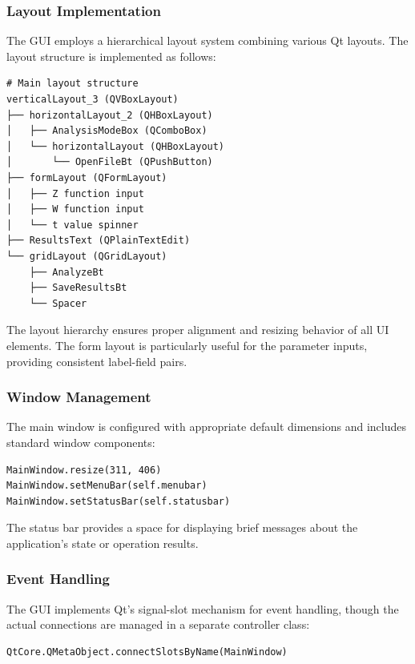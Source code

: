 \documentclass{article}
\begin{document}
\subsubsection{Layout Implementation}

The GUI employs a hierarchical layout system combining various Qt layouts. The layout structure is implemented as follows:

\begin{verbatim}
# Main layout structure
verticalLayout_3 (QVBoxLayout)
├── horizontalLayout_2 (QHBoxLayout)
│   ├── AnalysisModeBox (QComboBox)
│   └── horizontalLayout (QHBoxLayout)
│       └── OpenFileBt (QPushButton)
├── formLayout (QFormLayout)
│   ├── Z function input
│   ├── W function input
│   └── t value spinner
├── ResultsText (QPlainTextEdit)
└── gridLayout (QGridLayout)
    ├── AnalyzeBt
    ├── SaveResultsBt
    └── Spacer
\end{verbatim}

The layout hierarchy ensures proper alignment and resizing behavior of all UI elements. The form layout is particularly useful for the parameter inputs, providing consistent label-field pairs.

\subsubsection{Window Management}

The main window is configured with appropriate default dimensions and includes standard window components:

\begin{verbatim}
MainWindow.resize(311, 406)
MainWindow.setMenuBar(self.menubar)
MainWindow.setStatusBar(self.statusbar)
\end{verbatim}

The status bar provides a space for displaying brief messages about the application's state or operation results.

\subsubsection{Event Handling}

The GUI implements Qt's signal-slot mechanism for event handling, though the actual connections are managed in a separate controller class:

\begin{verbatim}
QtCore.QMetaObject.connectSlotsByName(MainWindow)
\end{verbatim}
\end{document}
